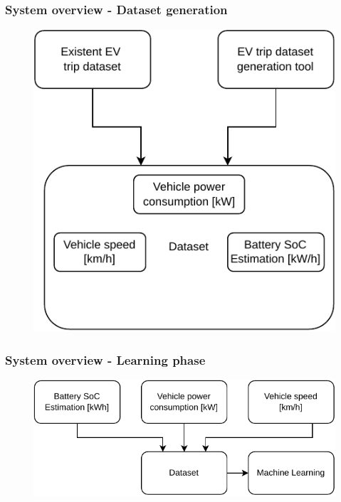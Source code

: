 \documentclass{beamer}
\begin{document}
\begin{frame}
	\frametitle{System overview - Dataset generation}
	\vspace{0.5cm}
	\begin{figure}[H]
		\begin{center}
			\includegraphics[scale=0.80]{./figures/report_generic_diagram_dataset_generation_phase.pdf}
		\end{center}
	\end{figure}
	
\end{frame}

\begin{frame}
	\frametitle{System overview - Learning phase}
	\vspace{0.5cm}
	\begin{figure}[H]
		\begin{center}
			\includegraphics[scale=0.80]{./figures/report_generic_diagram_learn_phase.pdf}
		\end{center}
	\end{figure}
	
\end{frame}
\end{document}
